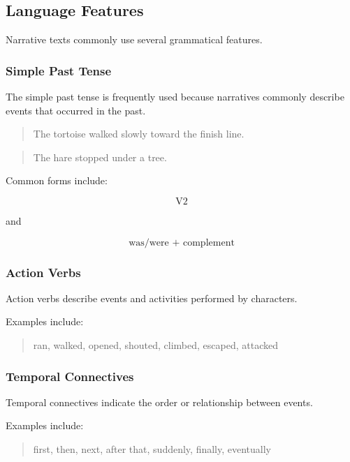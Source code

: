 \subsection{Language Features}

Narrative texts commonly use several grammatical features.

\subsubsection{Simple Past Tense}

The simple past tense is frequently used because narratives commonly describe events that occurred in the past.

\begin{quotation}
  The tortoise walked slowly toward the finish line.
\end{quotation}

\begin{quotation}
  The hare stopped under a tree.
\end{quotation}

Common forms include:

\[
\text{V2}
\]

and

\[
\text{was/were + complement}
\]

\subsubsection{Action Verbs}

Action verbs describe events and activities performed by characters.


Examples include:

\begin{quotation}
  ran, walked, opened, shouted, climbed, escaped, attacked
\end{quotation}

\subsubsection{Temporal Connectives}

Temporal connectives indicate the order or relationship between events.


Examples include:

\begin{quotation}
  first, then, next, after that, suddenly, finally, eventually
\end{quotation}


